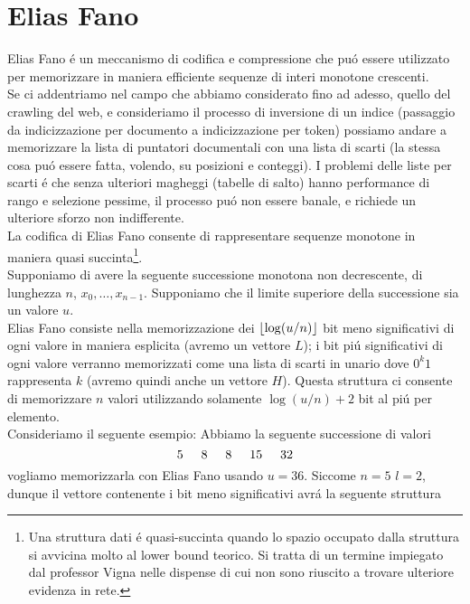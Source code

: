\section{Elias Fano}
Elias Fano é un meccanismo di codifica e compressione che puó essere utilizzato per memorizzare in maniera efficiente sequenze di interi monotone crescenti.\\
Se ci addentriamo nel campo che abbiamo considerato fino ad adesso, quello del crawling del web, e consideriamo il processo di inversione di un indice (passaggio da indicizzazione per documento a indicizzazione per token) possiamo andare a memorizzare la lista di puntatori documentali con una lista di scarti (la stessa cosa puó essere fatta, volendo, su posizioni e conteggi). I problemi delle liste per scarti é che senza ulteriori magheggi (tabelle di salto) hanno performance di rango e selezione pessime, il processo puó non essere banale, e richiede un ulteriore sforzo non indifferente.\\
La codifica di Elias Fano consente di rappresentare sequenze monotone in maniera quasi succinta\footnote{Una struttura dati é quasi-succinta quando lo spazio occupato dalla struttura si avvicina molto al lower bound teorico. Si tratta di un termine impiegato dal professor Vigna nelle dispense di cui non sono riuscito a trovare ulteriore evidenza in rete.}.\\
Supponiamo di avere la seguente successione monotona non decrescente, di lunghezza $n$, $x_0, \dots, x_{n - 1}$. Supponiamo che il limite superiore della successione sia un valore $u$.\\
Elias Fano consiste nella memorizzazione dei $\left\lfloor \log(u / n) \right\rfloor$ bit meno significativi di ogni valore in maniera esplicita (avremo un vettore $L$); i bit piú significativi di ogni valore verranno memorizzati come una lista di scarti in unario dove $0^k1$ rappresenta $k$ (avremo quindi anche un vettore $H$). Questa struttura ci consente di memorizzare $n$ valori utilizzando solamente $\log(u / n) + 2$ bit al piú per elemento.\\
Consideriamo il seguente esempio: Abbiamo la seguente successione di valori
\begin{equation*}
    5\hspace{5mm}8\hspace{5mm}8\hspace{5mm}15\hspace{5mm}32
\end{equation*}
vogliamo memorizzarla con Elias Fano usando $u = 36$. Siccome $n = 5$ $l = 2$, dunque il vettore contenente i bit meno significativi avrá la seguente struttura
